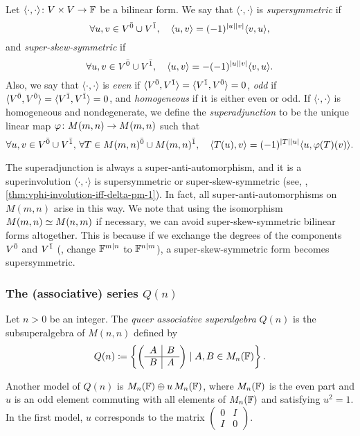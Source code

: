 \begin{defi}
Let $\langle \cdot, \cdot \rangle \colon V\times V \to \mathbb{F}$ be a bilinear form. 
We say that $\langle \cdot, \cdot \rangle$ is  \emph{supersymmetric} if
\[
    \forall u,v \in V^{\bar0} \cup V^{\bar1}, \quad \langle u, v \rangle 
    = (-1)^{|u||v|} \langle v, u \rangle,
\]
and \emph{super-skew-symmetric} if
\[
    \forall u,v \in V^{\bar0} \cup V^{\bar1}, \quad \langle u, v \rangle 
    = -(-1)^{|u||v|} \langle v, u \rangle.
\]
Also, we say that $\langle \cdot, \cdot \rangle$ is \emph{even} if $\langle V^{\bar0}, V^{\bar1} \rangle = \langle V^{\bar1}, V^{\bar0} \rangle = 0$, \emph{odd} if $\langle V^{\bar0}, V^{\bar0} \rangle = \langle V^{\bar1}, V^{\bar1} \rangle = 0$, and \emph{homogeneous} if it is either even or odd. 
If $\langle \cdot, \cdot \rangle$ is homogeneous and nondegenerate, we define the \emph{superadjunction} to be the unique linear map $\varphi\colon M(m,n) \to M(m,n)$ such that 
\[
    \forall u,v \in V^{\bar0} \cup V^{\bar1},\,
    \forall T\in M(m,n)^{\bar0} \cup M(m,n)^{\bar1}, \quad
    \langle T(u), v \rangle = (-1)^{|T||u|} \langle u, \varphi(T)(v) \rangle. 
\]
\end{defi}

The superadjunction is always a super-anti-automorphism, and it is a superinvolution \IFF $\langle \cdot, \cdot \rangle$ is supersymmetric or super-skew-symmetric (see, \eg, \cref{thm:vphi-involution-iff-delta-pm-1}). 
In fact, all super-anti-automorphisms on $M(m,n)$ arise in this way. 
We note that using the isomorphism $M(m,n) \simeq M(n,m)$ if necessary, we can avoid super-skew-symmetric bilinear forms altogether. 
This is because if we exchange the degrees of the components $V^{\bar0}$ and $V^{\bar1}$ (\ie, change $\mathbb{F}^{m|n}$ to $\mathbb{F}^{n|m}$), a super-skew-symmetric form becomes supersymmetric. 

\subsubsection{The (associative) series \texorpdfstring{$Q(n)$}{Q(n)}}

Let $n > 0$ be an integer. 
The \emph{queer associative superalgebra} $Q(n)$ is the subsuperalgebra of $M(n,n)$ defined by
\[
    Q(n) \coloneqq \left\{ \left(\begin{array}{c|c}
        A & B\\
        \hline
        B & A
    \end{array}\right)
    \mid A,B\in M_{n}(\mathbb{F})
    \right\}.
\]

Another model of $Q(n)$ is $M_n(\mathbb{F}) \oplus u\, M_n(\mathbb{F})$, where $M_n(\mathbb{F})$ is the even part and $u$ is an odd element commuting with all elements of $M_n(\mathbb{F})$ and satisfying $u^2 = 1$. 
In the first model, $u$ corresponds to the matrix
$
    \left(\begin{array}{c|c}
        0 & I\\
        \hline
        I & 0
    \end{array}\right).
$

